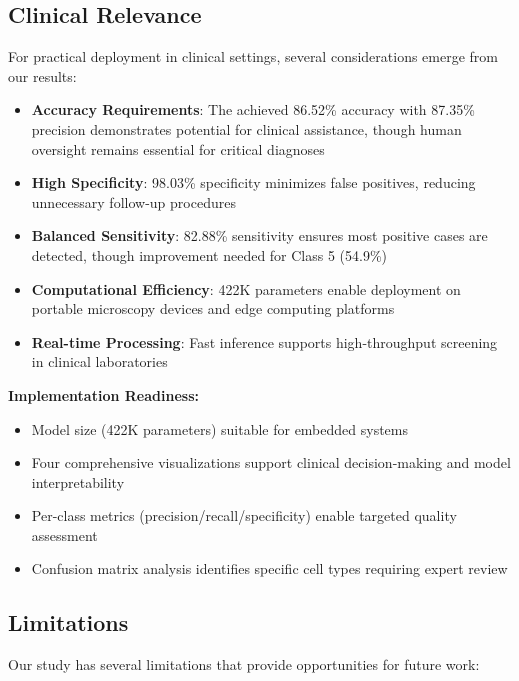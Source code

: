 \documentclass[runningheads]{llncs}
\begin{document}
\subsection{Clinical Relevance}

For practical deployment in clinical settings, several considerations emerge from our results:

\begin{itemize}
    \item \textbf{Accuracy Requirements}: The achieved 86.52\% accuracy with 87.35\% precision demonstrates potential for clinical assistance, though human oversight remains essential for critical diagnoses
    \item \textbf{High Specificity}: 98.03\% specificity minimizes false positives, reducing unnecessary follow-up procedures
    \item \textbf{Balanced Sensitivity}: 82.88\% sensitivity ensures most positive cases are detected, though improvement needed for Class 5 (54.9\%)
    \item \textbf{Computational Efficiency}: 422K parameters enable deployment on portable microscopy devices and edge computing platforms
    \item \textbf{Real-time Processing}: Fast inference supports high-throughput screening in clinical laboratories
\end{itemize}

\textbf{Implementation Readiness:}
\begin{itemize}
    \item Model size (422K parameters) suitable for embedded systems
    \item Four comprehensive visualizations support clinical decision-making and model interpretability
    \item Per-class metrics (precision/recall/specificity) enable targeted quality assessment
    \item Confusion matrix analysis identifies specific cell types requiring expert review
\end{itemize}

\subsection{Limitations}

Our study has several limitations that provide opportunities for future work:
\end{document}
